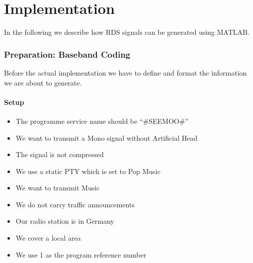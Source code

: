 \documentclass[sigconf]{acmart}
\begin{document}



\section{Implementation}

In the following we describe how RDS signals can be generated using MATLAB.

\hypertarget{Preparation:ux20Basebandux20Coding}{%
\subsubsection{Preparation: Baseband
Coding}\label{Preparation:ux20Basebandux20Coding}}

Before the actual implementation we have to define and format the
information we are about to generate.

\hypertarget{Setup}{%
\paragraph{Setup}\label{Setup}}

\begin{itemize}
\item The programme service name should be ``\#SEEMOO\#''
\item We want to transmit a Mono signal without Artificial Head
\item The signal is not compressed
\item We use a static PTY which is set to Pop Music
\item We want to transmit Music
\item We do not carry traffic announcements
\item Our radio station is in Germany
\item We cover a local area
\item We use 1 as the program reference number
\end{itemize}
\end{document}
